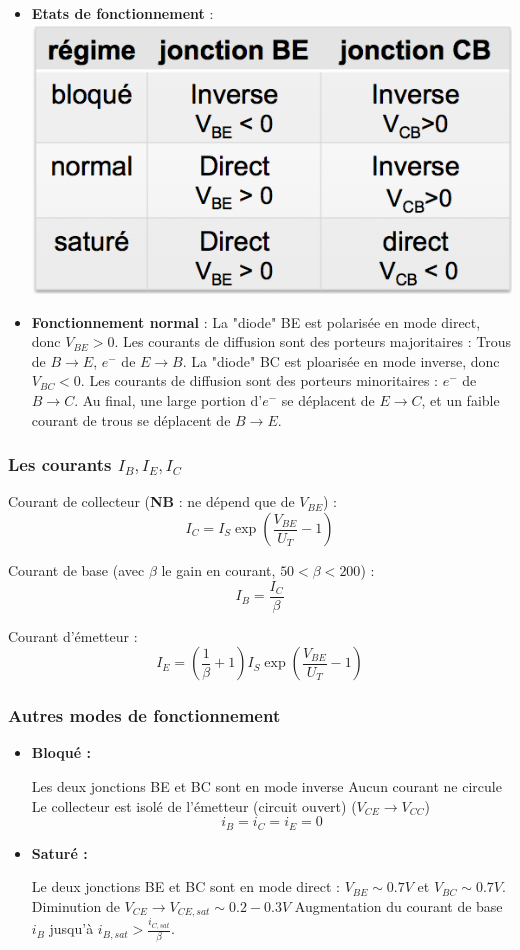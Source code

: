 \documentclass[]{article}
\begin{document}
\begin{itemize}
\item \textbf{Etats de fonctionnement} :\quad \quad
\includegraphics[scale=0.6]{npn_etats.png} 

\item \textbf{Fonctionnement normal} :
La "diode" BE est polarisée en mode direct, donc $V_{BE} > 0$. Les courants de diffusion sont des porteurs majoritaires : Trous de $B\rightarrow E$, $e^-$ de $E\rightarrow B$.
La "diode" BC est ploarisée en mode inverse, donc $V_{BC} <  0$.  Les courants de diffusion sont des porteurs minoritaires :  $e^-$ de $B\rightarrow C$.
Au final, une large portion d'$e^-$ se déplacent de $E\rightarrow C$, et un faible courant de trous se déplacent de $B \rightarrow E$.
\end{itemize}

\subsubsection{Les courants $I_B,I_E,I_C$}

Courant de collecteur (\textbf{NB} : ne dépend que de $V_{BE}$) : 
$$I_C = I_S \exp{(\frac{V_{BE}}{U_T}-1)}$$ 

Courant de base (avec $\beta$ le gain en courant, $50 < \beta < 200$) : 
$$ I_B = \frac{I_C}{\beta} $$

Courant d'émetteur : $$ I_E =  ( \frac{1}{\beta} + 1 ) I_S \exp{(\frac{V_{BE}}{U_T}-1)}$$

\subsubsection{Autres modes de fonctionnement}
\begin{itemize}
\item \textbf{Bloqué :}

Les deux jonctions BE et BC sont en mode inverse
Aucun courant ne circule
Le collecteur est isolé de l'émetteur (circuit ouvert) ($V_{CE} \rightarrow V_{CC}$)
$$ i_B = i_C = i_E = 0 $$
\item \textbf{Saturé :}

Le deux jonctions BE et BC sont en mode direct : $V_{BE} \sim 0.7V$ et $ V_{BC} \sim 0.7V$.
Diminution de $V_{CE} \rightarrow V_{CE,sat} \sim 0.2-0.3V$
Augmentation du courant de base $i_B$ jusqu'à $i_{B,sat} > \frac{i_{C,sat}}{\beta}$.
\end{itemize}
\end{document}
